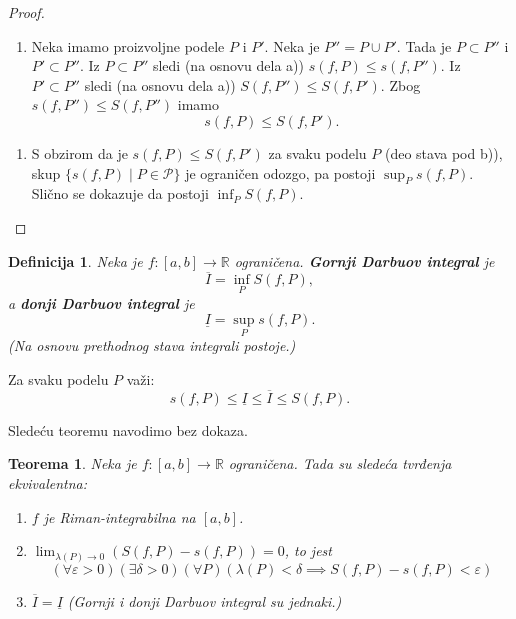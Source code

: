 \documentclass[a4paper,12pt,twoside]{report}
\newtheorem{theorem}{Teorema}[section]
\newtheorem{definition}{Definicija}[section]
\numberwithin{algorithm}{section}
\begin{document}
\begin{proof}
\begin{enumerate}[label=\alph*)]
        
        \item Neka imamo proizvoljne podele $P$ i $P'$. Neka je $P'' = P \cup P'$. Tada je $P \subset P''$ i $P' \subset P''$.
        Iz $P \subset P''$ sledi (na osnovu dela a)) $s(f, P) \leq s(f, P'')$.
        Iz $P' \subset P''$ sledi (na osnovu dela a)) $S(f, P'') \leq S(f, P')$.
        Zbog $s(f, P'') \leq S(f, P'')$ imamo
        \[
            s(f, P) \leq S(f, P').
        \]
    \end{enumerate}
    
    \begin{enumerate}[label=\alph*), start=3]
        \item S obzirom da je $s(f, P) \leq S(f, P')$ za svaku podelu $P$ (deo stava pod b)), skup $\{s(f, P) \mid P \in \mathcal{P}\}$ je ograničen odozgo, pa postoji $\sup_P s(f, P)$. Slično se dokazuje da postoji $\inf_P S(f, P)$.
    \end{enumerate}
    
\end{proof}

\begin{definition}
    Neka je $f: [a, b] \to \mathbb{R}$ ograničena.
    \textbf{Gornji Darbuov integral} je \[\displaystyle \overline{I} = \inf_P S(f, P),\]
    a \textbf{donji Darbuov integral} je \[\displaystyle \underline{I} = \sup_P s(f, P).\]
    (Na osnovu prethodnog stava integrali postoje.)
\end{definition}

Za svaku podelu $P$ važi: \[\displaystyle s(f, P) \leq \underline{I} \leq \overline{I} \leq S(f, P).\] 

Sledeću teoremu navodimo bez dokaza.

\begin{theorem}
    Neka je $f: [a, b] \to \mathbb{R}$ ograničena. Tada su sledeća tvrđenja ekvivalentna:
    \begin{enumerate}[label=\alph*)]
        \item $f$ je Riman-integrabilna na $[a, b]$.
        \item $\displaystyle \lim_{\lambda(P) \to 0} (S(f, P) - s(f, P)) = 0$, to jest
        \[
            (\forall \varepsilon > 0) (\exists \delta > 0) (\forall P) (\lambda(P) < \delta \implies S(f, P) - s(f, P) < \varepsilon)
        \]
        \item $\overline{I} = \underline{I}$ (Gornji i donji Darbuov integral su jednaki.)
    \end{enumerate}
\end{theorem}
\end{document}
